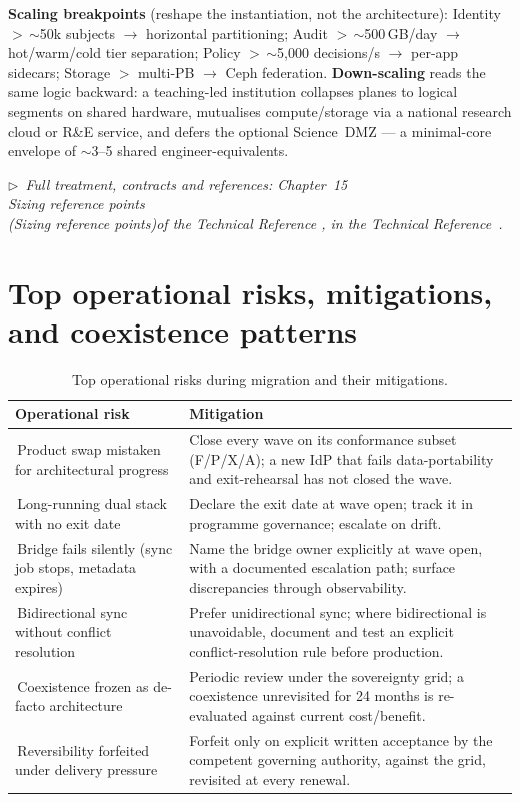 \documentclass[11pt,a4paper,twoside]{article}
\newcommand{\trchap}[2]{%
  Chapter~#1%
  \ifx\\#2\\\else\space(\emph{#2})\fi\space of the Technical Reference%
}
\newcommand{\mainref}[1]{%
  \par\vspace{1pt}
  {\footnotesize\color{gray}\itshape
  $\triangleright$~Full treatment, contracts and references: #1,
  in the Technical Reference~\cite{ng-tech-ref-2026}.}\par\vspace{2pt}}
\begin{document}
\noindent\textbf{Scaling breakpoints} (reshape the instantiation, not the
architecture): Identity $>$\,$\sim$50k subjects $\to$ horizontal
partitioning; Audit $>$\,$\sim$500\,GB/day $\to$ hot/warm/cold tier
separation; Policy $>$\,$\sim$5{,}000 decisions/s $\to$ per-app sidecars;
Storage $>$ multi-PB $\to$ Ceph federation. \textbf{Down-scaling} reads the
same logic backward: a teaching-led institution collapses planes to logical
segments on shared hardware, mutualises compute/storage via a national
research cloud or R\&E service, and defers the optional Science~DMZ ---
a minimal-core envelope of $\sim$3--5 shared engineer-equivalents.

\mainref{\trchap{15}{Sizing reference points}}

\section{Top operational risks, mitigations, and coexistence patterns}

\begin{table}[h!]
\centering\small
\newcommand{\warn}{\textcolor{BrickRed}{\ding{72}}\,}%
\begin{tabularx}{\textwidth}{
  >{\raggedright\arraybackslash}p{4.4cm} X}
\toprule
\textbf{Operational risk} & \textbf{Mitigation} \\
\midrule
\warn Product swap mistaken for architectural progress &
  Close every wave on its conformance subset (F/P/X/A); a new IdP that fails
  data-portability and exit-rehearsal has not closed the wave. \\
\addlinespace
\warn Long-running dual stack with no exit date &
  Declare the exit date at wave open; track it in programme governance;
  escalate on drift. \\
\addlinespace
\warn Bridge fails silently (sync job stops, metadata expires) &
  Name the bridge owner explicitly at wave open, with a documented
  escalation path; surface discrepancies through observability. \\
\addlinespace
\warn Bidirectional sync without conflict resolution &
  Prefer unidirectional sync; where bidirectional is unavoidable, document
  and test an explicit conflict-resolution rule before production. \\
\addlinespace
\warn Coexistence frozen as de-facto architecture &
  Periodic review under the sovereignty grid; a coexistence unrevisited for
  24 months is re-evaluated against current cost/benefit. \\
\addlinespace
\warn Reversibility forfeited under delivery pressure &
  Forfeit only on explicit written acceptance by the competent governing
  authority, against the grid, revisited at every renewal. \\
\bottomrule
\end{tabularx}
\caption{Top operational risks during migration and their mitigations.}
\end{table}
\end{document}
